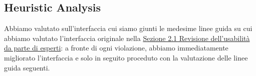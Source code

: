 






\subsection{Heuristic Analysis}
\label{ss:heuristic-analysis}
Abbiamo valutato sull'interfaccia cui siamo giunti le medesime linee guida su cui abbiamo valutato l'interfaccia originale nella \hyperref[s:revisione-usabilita-esperti]{Sezione 2.1 Revisione dell'usabilità da parte di esperti}: a fronte di ogni violazione, abbiamo immediatamente migliorato l'interfaccia e solo in seguito proceduto con la valutazione delle linee guida seguenti.
